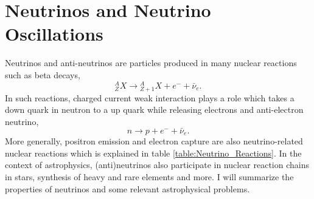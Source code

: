 

\chapter{\label{chap:basics}Neutrinos and Neutrino Oscillations}




Neutrinos and anti-neutrinos are particles produced in many nuclear reactions such as beta decays,
\begin{equation}
{}^A_Z X \to {}_{Z+1}^AX + e^- +\bar \nu_e .
\end{equation}
In such reactions, charged current weak interaction plays a role which takes a down quark in neutron to a up quark while releasing electrons and anti-electron neutrino,
\begin{equation}
n\to p + e^- + \bar \nu_e .
\end{equation}
More generally, positron emission and electron capture are also neutrino-related nuclear reactions which is explained in table \ref{table:Neutrino_Reactions}. In the context of astrophysics, (anti)neutrinos also participate in nuclear reaction chains in stars, synthesis of heavy and rare elements and more. I will summarize the properties of neutrinos and some relevant astrophysical problems.

